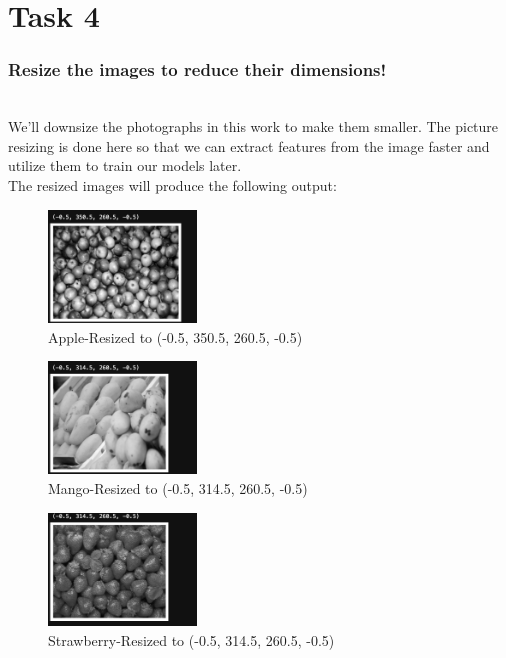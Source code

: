 \documentclass[conference]{IEEEtran}
\begin{document}
\section{Task 4}
\subsubsection{Resize the images to reduce their dimensions!}\\
We'll downsize the photographs in this work to make them smaller. The picture resizing is done here so that we can extract features from the image faster and utilize them to train our models later. \\
The resized images will produce the following output:

\begin{figure}[!htbp]
    \centering
    \includegraphics[height=3cm]{apple_resized.png} 
     \caption{Apple-Resized to (-0.5, 350.5, 260.5, -0.5)}
  \label{fig:AppleGray-Resized}
   
\end{figure}

\begin{figure}[!htbp]
    \centering
    \includegraphics[height=3cm]{mango_resized.png}
   \caption{Mango-Resized to (-0.5, 314.5, 260.5, -0.5)}
  \label{fig:AppleGray-Resized Dimension}
   
\end{figure}

\begin{figure}[!htbp]
    \centering
    \includegraphics[height=3cm]{strawberry_resized.png} 
    \caption{Strawberry-Resized to (-0.5, 314.5, 260.5, -0.5) }
  \label{fig:mangoGray-Resized }
    
\end{figure}
\end{document}
